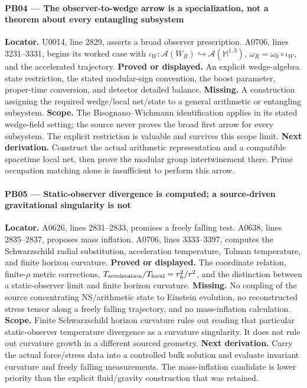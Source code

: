 \paragraph{PB04 --- The observer-to-wedge arrow is a specialization, not
a theorem about every entangling
subsystem}\label{TranscriptLedgerStage:pb04-the-observer-to-wedge-arrow-is-a-specialization-not-a-theorem-about-every-entangling-subsystem}

\textbf{Locator.} U0014, line 2829, asserts a broad observer
prescription. A0706, lines 3231--3331, begins its worked case with
\(\iota_W:\mathcal A(W_R)\hookrightarrow\mathcal A(\mathbb M^{1,3})\),
\(\omega_R=\omega_0\circ\iota_W\), and the accelerated trajectory.
\textbf{Proved or displayed.} An explicit wedge-algebra state
restriction, the stated modular-sign convention, the boost parameter,
proper-time conversion, and detector detailed balance. \textbf{Missing.}
A construction assigning the required wedge/local net/state to a general
arithmetic or entangling subsystem. \textbf{Scope.} The
Bisognano--Wichmann identification applies in its stated wedge-field
setting; the source never proves the broad first arrow for every
subsystem. The explicit restriction is valuable and survives this scope
limit. \textbf{Next derivation.} Construct the actual arithmetic
representation and a compatible spacetime local net, then prove the
modular group intertwinement there. Prime occupation matching alone is
insufficient to perform this arrow.

\paragraph{PB05 --- Static-observer divergence is computed; a
source-driven gravitational singularity is
not}\label{TranscriptLedgerStage:pb05-static-observer-divergence-is-computed-a-source-driven-gravitational-singularity-is-not}

\textbf{Locator.} A0626, lines 2831--2833, promises a freely falling
test. A0638, lines 2835--2837, proposes mass inflation. A0706, lines
3333--3397, computes the Schwarzschild radial substitution, acceleration
temperature, Tolman temperature, and finite horizon curvature.
\textbf{Proved or displayed.} The coordinate relation, finite-\(\rho\)
metric corrections, \(T_{\rm acceleration}/T_{\rm local}=r_h^2/r^2\),
and the distinction between a static-observer limit and finite horizon
curvature. \textbf{Missing.} No coupling of the source concentrating
NS/arithmetic state to Einstein evolution, no reconstructed stress
tensor along a freely falling trajectory, and no mass-inflation
calculation. \textbf{Scope.} Finite Schwarzschild horizon curvature
rules out reading that particular static-observer temperature divergence
as a curvature singularity. It does not rule out curvature growth in a
different sourced geometry. \textbf{Next derivation.} Carry the actual
force/stress data into a controlled bulk solution and evaluate invariant
curvature and freely falling measurements. The mass-inflation candidate
is lower priority than the explicit fluid/gravity construction that was
retained.

